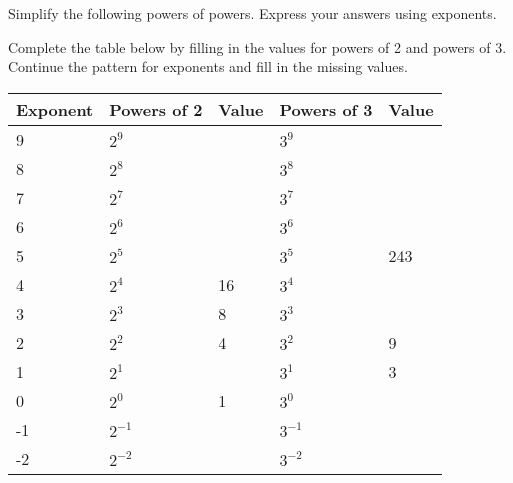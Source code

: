 \documentclass[12pt, a4paper, addpoints]{exam}
\newcommand{\ms}{\vspace{20mm}}
\begin{document}
\begin{questions}
\question Simplify the following powers of powers. Express your answers using exponents.
\setlength{\columnsep}{20pt} 
\begin{multicols}{3}
\end{multicols}


\question Complete the table below by filling in the values for powers of 2 and powers of 3. Continue the pattern for exponents and fill in the missing values.

\begin{center}
\renewcommand{\arraystretch}{1.5} %
\begin{tabularx}{\textwidth}{|X|X|X|X|X|}
\hline
\textbf{Exponent} & \textbf{Powers of 2} & \textbf{Value} & \textbf{Powers of 3} & \textbf{Value} \\
\hline
9 & \(2^9\) &  & \(3^9\) &  \\
\hline
8 & \(2^8\) &  & \(3^8\) &  \\
\hline
7 & \(2^7\) &  & \(3^7\) &  \\
\hline
6 & \(2^6\) &  & \(3^6\) &  \\
\hline
5 & \(2^5\) &  & \(3^5\) & 243 \\
\hline
4 & \(2^4\) & 16 & \(3^4\) &  \\
\hline
3 & \(2^3\) & 8 & \(3^3\) &  \\
\hline
2 & \(2^2\) & 4 & \(3^2\) & 9 \\
\hline
1 & \(2^1\) &  & \(3^1\) & 3 \\
\hline
0 & \(2^0\) & 1 & \(3^0\) &  \\
\hline
-1 & \(2^{-1}\) &  & \(3^{-1}\) &  \\
\hline
-2 & \(2^{-2}\) &  & \(3^{-2}\) &  \\
\hline
\end{tabularx}
\end{center}


\end{questions}
\end{document}
